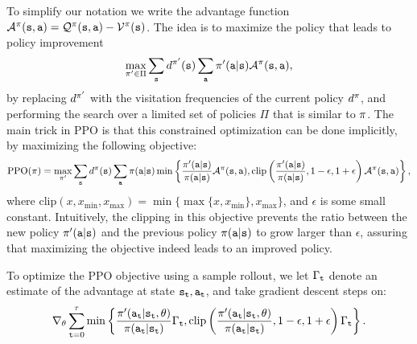 To simplify our notation we write the advantage function $\mathcal{A}^{\pi}({\tt s},{\tt a}) = \mathcal{Q}^{\pi}({\tt s},{\tt a}) - \mathcal{V}^{\pi}({\tt s})$. The idea is to maximize the policy that leads to policy improvement
\begin{equation*}
    \max_{\pi'\in \Pi}\sum_{{\tt s}} d^{\pi'}({\tt s}) \sum_{\tt a} \pi'({\tt a}|{\tt s})\mathcal{A}^{\pi}({\tt s},{\tt a}),
\end{equation*}
by replacing $d^{\pi'}$ with the visitation frequencies of the current policy $d^{\pi}$, and performing the search over a limited set of policies $\Pi$ that is similar to $\pi$. The main trick in PPO is that this constrained optimization can be done implicitly, by maximizing the following objective:
\begin{equation}\label{eq:PPO}
    \textrm{PPO}(\pi) = \max_{\pi'}\sum_{{\tt s}} d^{\pi}({\tt s}) \sum_{\tt a} \pi({\tt a}|{\tt s}) \min \left\{\frac{\pi'({\tt a}|{\tt s})}{\pi({\tt a}|{\tt s})}\mathcal{A}^{\pi}({\tt s},{\tt a}),  \textrm{clip}\left(\frac{\pi'({\tt a}|{\tt s})}{\pi({\tt a}|{\tt s})} , 1-\epsilon, 1+\epsilon\right)\mathcal{A}^{\pi}({\tt s},{\tt a}) \right\},
\end{equation}
where $\textrm{clip}\left(x , x_{\min}, x_{\max}\right) = \min\{\max\{x, x_{\min}\}, x_{\max}\}$,
and $\epsilon$ is some small constant. Intuitively, the clipping in this objective prevents the ratio between the new policy $\pi'({\tt a}|{\tt s})$ and the previous policy $\pi({\tt a}|{\tt s})$ to grow larger than $\epsilon$, assuring that maximizing the objective indeed leads to an improved policy.

To optimize the PPO objective using a sample rollout, we let $\Gamma_{\tt t}$ denote an estimate of the advantage at state ${\tt s}_{\tt t}, {\tt a}_{\tt t}$, and take gradient descent steps on:
\begin{equation*}
    \nabla_{\theta}\sum_{{\tt t}=0}^\tau \min \left\{\frac{\pi'({\tt a}_{\tt t}|{\tt s}_{\tt t}, \theta)}{\pi({\tt a}_{\tt t}|{\tt s}_{\tt t})}\Gamma_{\tt t},  \textrm{clip}\left(\frac{\pi'({\tt a}_{\tt t}|{\tt s}_{\tt t}, \theta)}{\pi({\tt a}_{\tt t}|{\tt s}_{\tt t})} , 1-\epsilon, 1+\epsilon\right)\Gamma_{\tt t} \right\}.
\end{equation*}

